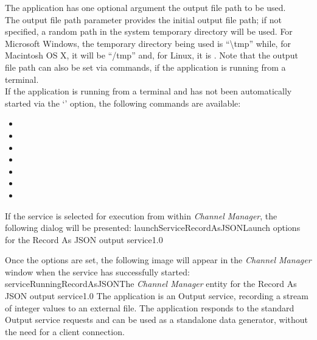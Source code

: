 The application has one optional argument \longDash{} the output file path to be used.
\insertAppParameters
{}
\insertOutputServiceComment\\

The output file path parameter provides the initial output file path; if not specified, a
random path in the system temporary directory will be used.
For Microsoft Windows, the temporary directory being used is ``\textbackslash{}tmp''
while, for Macintosh OS X, it will be ``/tmp'' and, for Linux, it is \TBD.
Note that the output file path can also be set via commands, if the application is
running from a terminal.\\

If the application is running from a terminal and has not been automatically started via
the `' option, the following commands are available:
\begin{itemize}
\item{}
\item\exSp{}
\item\exSp{}
\item\exSp{}
\item\exSp{}
\item\exSp{}
\item\exSp{}
\end{itemize}
\condPage
If the service is selected for execution from within \emph{Channel Manager}, the following
dialog will be presented:
%
{launchServiceRecordAsJSON}{Launch options for the Record As JSON output service}{1.0}

Once the options are set, the following image will appear in the \emph{Channel Manager}
window when the service has successfully started:
%
{serviceRunningRecordAsJSON}{The \emph{Channel Manager} entity for the Record As JSON
output service}{1.0}
\condPage
{}
The  application is an Output
service, recording a stream of integer values to an external file.
The application responds to the standard Output service requests and can be used as a
standalone data generator, without the need for a client connection.\\

